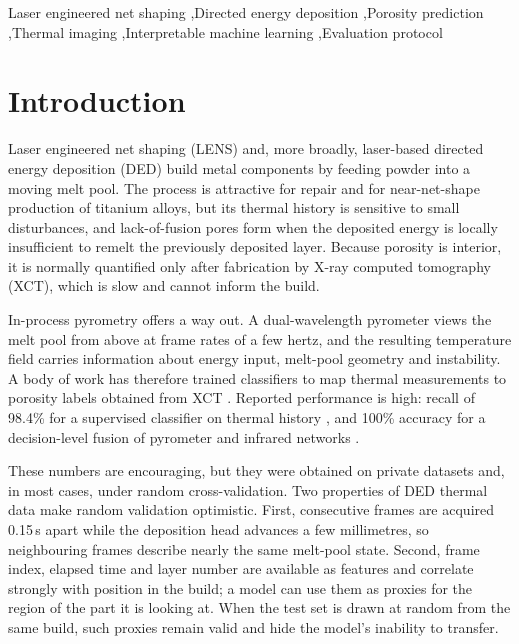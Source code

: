 \documentclass[preprint,12pt]{elsarticle}
\begin{document}
\begin{frontmatter}
\begin{keyword}
Laser engineered net shaping \sep Directed energy deposition \sep Porosity prediction \sep Thermal imaging \sep Interpretable machine learning \sep Evaluation protocol
\end{keyword}

\end{frontmatter}

\linenumbers

\section{Introduction}

Laser engineered net shaping (LENS) and, more broadly, laser-based directed energy deposition (DED) build metal components by feeding powder into a moving melt pool. The process is attractive for repair and for near-net-shape production of titanium alloys, but its thermal history is sensitive to small disturbances, and lack-of-fusion pores form when the deposited energy is locally insufficient to remelt the previously deposited layer. Because porosity is interior, it is normally quantified only after fabrication by X-ray computed tomography (XCT), which is slow and cannot inform the build.

In-process pyrometry offers a way out. A dual-wavelength pyrometer views the melt pool from above at frame rates of a few hertz, and the resulting temperature field carries information about energy input, melt-pool geometry and instability. A body of work has therefore trained classifiers to map thermal measurements to porosity labels obtained from XCT \cite{khanzadeh2018,tian2020,guo2023}. Reported performance is high: recall of 98.4\% for a supervised classifier on thermal history \cite{khanzadeh2018}, and 100\% accuracy for a decision-level fusion of pyrometer and infrared networks \cite{tian2020}.

These numbers are encouraging, but they were obtained on private datasets and, in most cases, under random cross-validation. Two properties of DED thermal data make random validation optimistic. First, consecutive frames are acquired 0.15\,s apart while the deposition head advances a few millimetres, so neighbouring frames describe nearly the same melt-pool state. Second, frame index, elapsed time and layer number are available as features and correlate strongly with position in the build; a model can use them as proxies for the region of the part it is looking at. When the test set is drawn at random from the same build, such proxies remain valid and hide the model's inability to transfer.
\end{document}
